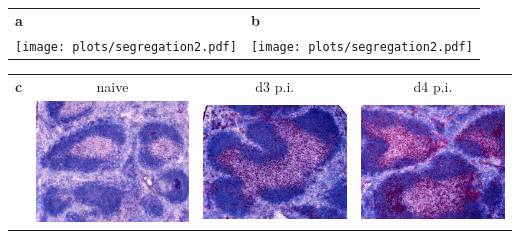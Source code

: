 \documentclass[a4paper]{article}
\newcommand{\s}[1]{{\bfseries\Large #1}}
\begin{document}
\begin{tabular}{ll}
\s{a} & \s{b} \\
\texttt{[image: plots/segregation2.pdf]} & 
\texttt{[image: plots/segregation2.pdf]} \\ 
\end{tabular}

\begin{tabular}{cccc}
	\multicolumn{1}{l}{\s{c}} & 
	naive & d3 p.i. & d4 p.i. \\
	& 
	\includegraphics[scale=.72]{images/control.png} & 
\includegraphics[scale=.72]{images/d3.png} & 
\includegraphics[scale=.72]{images/d4.png} \\
\end{tabular}
\end{document}
